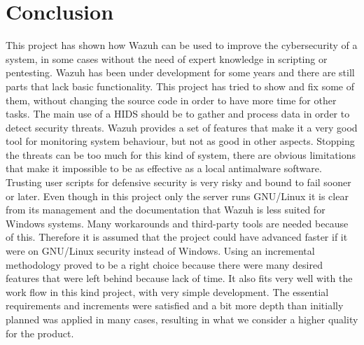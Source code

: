 \section{Conclusion}
This project has shown how Wazuh can be used to improve the cybersecurity of a system, in some cases without the need of expert knowledge in scripting or pentesting.
\linej
Wazuh has been under development for some years and there are still parts that lack basic functionality.
This project has tried to show and fix some of them, without changing the source code in order to have more time for other tasks.
\linej
\linej
The main use of a HIDS should be to gather and process data in order to detect security threats.
Wazuh provides a set of features that make it a very good tool for monitoring system behaviour, but not as good in other aspects.
\linej
Stopping the threats can be too much for this kind of system, there are obvious limitations that make it impossible to be as effective as a local antimalware software.
Trusting user scripts for defensive security is very risky and bound to fail sooner or later.
\linej
\linej
Even though in this project only the server runs GNU/Linux it is clear from its management and the documentation that Wazuh is less suited for Windows systems.
Many workarounds and third-party tools are needed because of this.
Therefore it is assumed that the project could have advanced faster if it were on GNU/Linux security instead of Windows.
\linej
\linej
Using an incremental methodology proved to be a right choice because there were many desired features that were left behind because lack of time.
It also fits very well with the work flow in this kind project, with very simple development.
The essential requirements and increments were satisfied and a bit more depth than initially planned was applied in many cases, resulting in what we consider a higher quality for the product.

